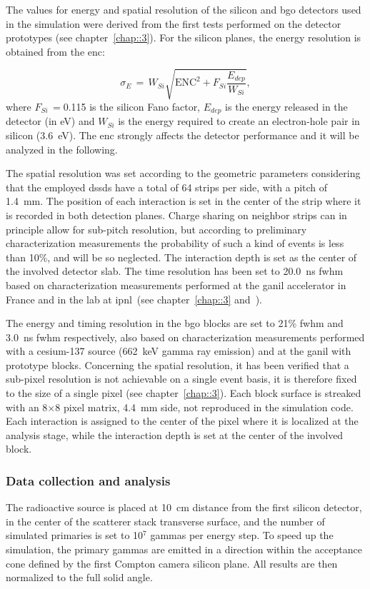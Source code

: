 The values for energy and spatial resolution of the silicon and \gls{bgo} detectors used in the simulation were derived from the first tests performed on the detector prototypes (see chapter~\ref{chap::3}). For the silicon planes, the energy resolution is obtained from the \gls{enc}:

\begin{equation}
\sigma_{E}\, = \,W_{Si} \sqrt{\mathrm{ENC}^{2} + F_{Si}\frac{E_{dep}}{W_{Si}}},
\label{chap5::eq::E_res_ENC}
\end{equation}
where $F_{Si}\,=$0.115 is the silicon Fano factor, $E_{dep}$ is the energy released in the detector (in eV) and $W_{Si}$ is the energy required to create an electron-hole pair in silicon (3.6~eV). The \gls{enc} strongly affects the detector performance and it will be analyzed in the following. 

The spatial resolution was set according to the geometric parameters considering that the employed \glspl{dssd} have a total of 64 strips per side, with a pitch of 1.4~mm. The position of each interaction is set in the center of the strip where it is recorded in both detection planes. Charge sharing on neighbor strips can in principle allow for sub-pitch resolution, but according to preliminary characterization measurements the probability of such a kind of events is less than 10\%, and will be so neglected. The interaction depth is set as the center of the involved detector slab. The time resolution has been set to 20.0~ns \gls{fwhm} based on characterization measurements performed at the \gls{ganil} accelerator in France and in the lab at \gls{ipnl}~(see chapter~\ref{chap::3} and~\cite{Ley2015}).

The energy and timing resolution in the \gls{bgo} blocks are set to 21\% \gls{fwhm} and 3.0~ns \gls{fwhm} respectively, also based on characterization measurements performed with a cesium-137 source (662~keV gamma ray emission) and at the \gls{ganil} with prototype blocks. Concerning the spatial resolution, it has been verified that a sub-pixel resolution is not achievable on a single event basis, it is therefore fixed to the size of a single pixel (see chapter~\ref{chap::3}). Each block surface is streaked with an 8$\times$8 pixel matrix, 4.4~mm side, not reproduced in the simulation code. Each interaction is assigned to the center of the pixel where it is localized at the analysis stage, while the interaction depth is set at the center of the involved block.

\subsubsection{Data collection and analysis}\label{chap5::subsubsec::CC_analysis}
The radioactive source is placed at 10~cm distance from the first silicon detector, in the center of the scatterer stack transverse surface, and the number of simulated primaries is set to 10$^{7}$ gammas per energy step. To speed up the simulation, the primary gammas are emitted in a direction within the acceptance cone defined by the first Compton camera silicon plane. All results are then normalized to the full solid angle. 

